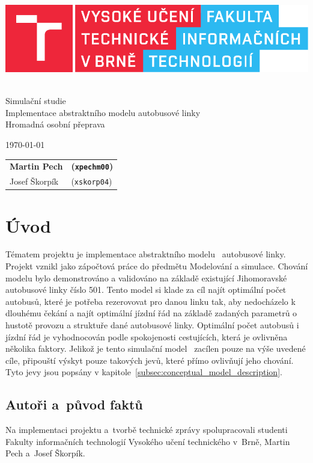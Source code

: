 \documentclass[a4paper]{article}
\newcommand{\logo} {
    \includegraphics[scale=0.8, keepaspectratio]{fig/logo.pdf}
}
\begin{document}
    \begin{titlepage}
        \begin{center}
            \logo
            \\
            {\Huge Simulační studie}\\\medskip
            {\LARGE Implementace abstraktního modelu autobusové linky}\\\medskip
            {\large	Hromadná osobní přeprava}
        \end{center}
        {\Large \today \hfill
        \begin{tabular}{l l}
            \textbf{Martin Pech} & \textbf{(\texttt{xpechm00})} \\
            Josef Škorpík & (\texttt{xskorp04})
        \end{tabular}}
    \end{titlepage}

    \newpage

	\section{Úvod}
    \label{sec:intro}

    Tématem projektu je implementace abstraktního modelu~\cite[snímek 10]{IMS_slides} autobusové linky.
    Projekt vznikl jako zápočtová práce do předmětu Modelování a simulace. Chování modelu bylo demonstrováno a validováno na základě existující Jihomoravské autobusové linky číslo 501. Tento model si klade za cíl najít optimální počet autobusů, které je potřeba rezerovovat pro danou linku tak, aby nedocházelo k dlouhému čekání a najít optimální jízdní řád na základě zadaných parametrů o hustotě provozu a struktuře dané autobusové linky. Optimální počet autobusů i jízdní řád je vyhodnocován podle spokojenosti cestujících, která je ovlivněna několika faktory. Jelikož je tento simulační model~\cite[snímek 44]{IMS_slides} zacílen pouze na výše uvedené cíle, připouští výskyt pouze takových jevů, které přímo ovlivňují jeho chování. Tyto jevy jsou popsány v kapitole~\ref{subsec:conceptual_model_description}.

        \subsection{Autoři a~původ faktů}
        \label{subsec:authors}

            Na implementaci projektu a~tvorbě technické zprávy spolupracovali studenti Fakulty informačních technologií Vysokého učení technického v~Brně, Martin Pech a~Josef Škorpík.
            
\end{document}
